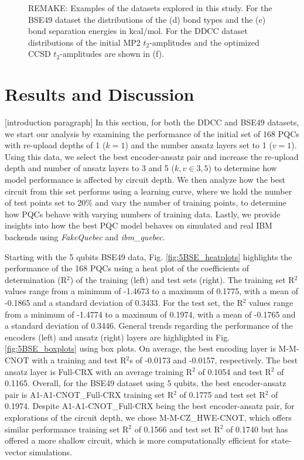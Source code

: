 \documentclass[journal=jacsat,manuscript=article]{achemso}
\begin{document}
\begin{figure}[H]
\begin{subfigure}[b]{0.3\textwidth}
		\caption{}
		\label{fig:waterddccdistribution}
	\end{subfigure}	
	\caption{REMAKE: Examples of the datasets explored in this study. For the BSE49 dataset the distributions of the (d) bond types and the (e) bond separation energies in kcal/mol. For the DDCC dataset distributions of the initial MP2 $t_{2}$-amplitudes and the optimized CCSD $t_{2}$-amplitudes are shown in (f).}
	\label{fig:bse_data}
\end{figure}





\section{Results and Discussion}
\label{section:results_and_discussion}
[introduction paragraph]
In this section, for both the DDCC and BSE49 datasets, we start our analysis by examining the performance of the initial set of 168 PQCs with re-upload depths of 1 ($k=1$) and the number ansatz layers set to 1 ($v=1$).
Using this data, we select the best encoder-ansatz pair and increase the re-upload depth and number of ansatz layers to 3 and 5 ($k,v \in {3,5}$) to determine how model performance is affected by circuit depth.
We then analyze how the best circuit from this set performs using a learning curve, where we hold the number of test points set to 20\% and vary the number of training points, to determine how PQCs behave with varying numbers of training data.
Lastly, we provide insights into how the best PQC model behaves on simulated and real IBM backends using \textit{FakeQuebec} and \textit{ibm{\_}quebec}.


Starting with the 5 qubits BSE49 data, Fig. \ref{fig:5BSE_heatplots} highlights the performance of the 168 PQCs using a heat plot of the coefficients of determination (R$^{2}$) of the training (left) and test sets (right).
The training set R$^2$ values range from a minimum of -1.4673 to a maximum of 0.1775, with a mean of -0.1865 and a standard deviation of 0.3433. 
For the test set, the R$^2$ values range from a minimum of -1.4774 to a maximum of 0.1974, with a mean of -0.1765 and a standard deviation of 0.3446.
General trends regarding the performance of the encoders (left) and ansatz (right) layers are highlighted in Fig. \ref{fig:5BSE_boxplots} using box plots.
On average, the best encoding layer is M-M-CNOT with a training and test R$^{2}$s of -0.0173 and -0.0157, respectively.
The best ansatz layer is Full-CRX with an average training  R$^{2}$ of 0.1054 and test R$^{2}$ of 0.1165.
Overall, for the BSE49 dataset using 5 qubits, the best encoder-ansatz pair is A1-A1-CNOT{\_}Full-CRX training set R$^{2}$ of 0.1775 and test set R$^{2}$ of 0.1974.
Despite A1-A1-CNOT{\_}Full-CRX being the best encoder-ansatz pair, for explorations of the circuit depth, we chose M-M-CZ{\_}HWE-CNOT, which offers similar performance training set R$^{2}$ of 0.1566 and test set R$^{2}$ of 0.1740 but has offered a more shallow circuit, which is more computationally efficient for state-vector simulations.
\end{document}
